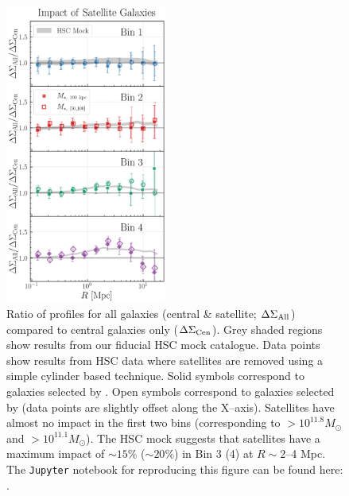 \documentclass[fleqn,usenatbib,useAMS]{mnras}
\begin{document}
\begin{figure}
    \centering
    \includegraphics[width=0.47\textwidth]{figure/fig_4}
    \caption{
        Ratio of \dsigma{} profiles for all galaxies (central \& satellite; $\Delta\Sigma_{\rm
        All}$) compared to central galaxies only ($\Delta\Sigma_{\rm Cen}$).
        Grey shaded regions show results from our fiducial HSC mock catalogue.
        Data points show results from HSC data where satellites are removed using a simple cylinder
        based technique. 
        Solid symbols correspond to galaxies selected by . 
        Open symbols correspond to galaxies selected by  (data points are slightly
        offset along the X--axis).
        Satellites have almost no impact in the first two bins (corresponding to $>
        10^{11.8} M_{\odot}$ and $> 10^{11.1} M_{\odot}$). 
        The HSC mock suggests that satellites have a maximum impact of $\sim 15$\% ($\sim 20$\%) in
        Bin 3 (4) at $R\sim 2$--4 Mpc.
        The \texttt{Jupyter} notebook for reproducing this figure can be found here:
        \href{https://github.com/dr-guangtou/jianbing/blob/master/notebooks/figure/fig4.ipynb}{\faGithub}.
    }
    \label{fig:satellite}
\end{figure}
\end{document}
